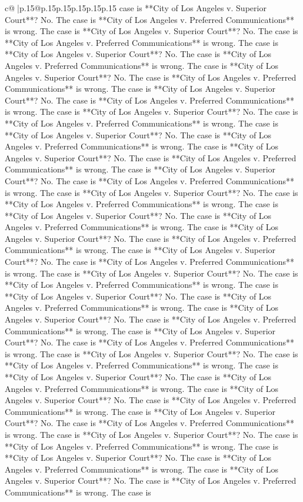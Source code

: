 \documentclass{article}
\begin{document}
{\begin{supertabular}{c@{$\;$}|p{.15\linewidth}@{}p{.15\linewidth}p{.15\linewidth}p{.15\linewidth}p{.15\linewidth}p{.15\linewidth}}
{{{case is **City of Los Angeles v. Superior Court**? No. The case is **City of Los Angeles v. Preferred Communications** is wrong. The case is **City of Los Angeles v. Superior Court**? No. The case is **City of Los Angeles v. Preferred Communications** is wrong. The case is **City of Los Angeles v. Superior Court**? No. The case is **City of Los Angeles v. Preferred Communications** is wrong. The case is **City of Los Angeles v. Superior Court**? No. The case is **City of Los Angeles v. Preferred Communications** is wrong. The case is **City of Los Angeles v. Superior Court**? No. The case is **City of Los Angeles v. Preferred Communications** is wrong. The case is **City of Los Angeles v. Superior Court**? No. The case is **City of Los Angeles v. Preferred Communications** is wrong. The case is **City of Los Angeles v. Superior Court**? No. The case is **City of Los Angeles v. Preferred Communications** is wrong. The case is **City of Los Angeles v. Superior Court**? No. The case is **City of Los Angeles v. Preferred Communications** is wrong. The case is **City of Los Angeles v. Superior Court**? No. The case is **City of Los Angeles v. Preferred Communications** is wrong. The case is **City of Los Angeles v. Superior Court**? No. The case is **City of Los Angeles v. Preferred Communications** is wrong. The case is **City of Los Angeles v. Superior Court**? No. The case is **City of Los Angeles v. Preferred Communications** is wrong. The case is **City of Los Angeles v. Superior Court**? No. The case is **City of Los Angeles v. Preferred Communications** is wrong. The case is **City of Los Angeles v. Superior Court**? No. The case is **City of Los Angeles v. Preferred Communications** is wrong. The case is **City of Los Angeles v. Superior Court**? No. The case is **City of Los Angeles v. Preferred Communications** is wrong. The case is **City of Los Angeles v. Superior Court**? No. The case is **City of Los Angeles v. Preferred Communications** is wrong. The case is **City of Los Angeles v. Superior Court**? No. The case is **City of Los Angeles v. Preferred Communications** is wrong. The case is **City of Los Angeles v. Superior Court**? No. The case is **City of Los Angeles v. Preferred Communications** is wrong. The case is **City of Los Angeles v. Superior Court**? No. The case is **City of Los Angeles v. Preferred Communications** is wrong. The case is **City of Los Angeles v. Superior Court**? No. The case is **City of Los Angeles v. Preferred Communications** is wrong. The case is **City of Los Angeles v. Superior Court**? No. The case is **City of Los Angeles v. Preferred Communications** is wrong. The case is **City of Los Angeles v. Superior Court**? No. The case is **City of Los Angeles v. Preferred Communications** is wrong. The case is **City of Los Angeles v. Superior Court**? No. The case is **City of Los Angeles v. Preferred Communications** is wrong. The case is **City of Los Angeles v. Superior Court**? No. The case is **City of Los Angeles v. Preferred Communications** is wrong. The case is **City of Los Angeles v. Superior Court**? No. The case is **City of Los Angeles v. Preferred Communications** is wrong. The case is }}}
\end{supertabular}}
\end{document}
